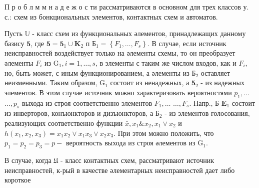 \documentclass[10pt]{article}
\begin{document}
П р о б л м м н а д е ж о с ти рассматриваются в основном для трех классов у. с.: схем из бонкциональных элементов, контактных схем и автоматов.



Пусть $\mathbb{U}$ - класс схем из функциональных әлементов, принадлежащих данному базису $\mathbf{5}$, где $\mathbf{5}=\mathbf{5}_{1} \cup \mathbf{K}_{2}$ п $\mathbf{Б}_{1}=\left\{F_{1}, \ldots, F_{s}\right\}$. В случае, если источник неисправностей воздействует только на әлементы схемы, то он преобразует әлементы $F_{i}$ из $\mathrm{G}_{1}, i=1, \ldots, s$, в элементы с таким же числом входов, как и $F_{i}$, но, быть может, с иным функционированием, а әлементы из $\mathbf{Б}_{2}$ оставляет неизменными. Таким образом, $\mathrm{G}_{1}$ состоит из ненадежных, а $\mathbf{5}_{2}$ - из надежных элементов. В этом случае источник можно характеризовать вероятностями $p_{1}, \ldots$ $\ldots, p_{s}$ выхода из строя соответственно элементов $F_{1}, \ldots$ $\ldots, F_{s}$. Напр., Б $\mathbf{E}_{1}$ состоит из инверторов, конъюнкторов и дизъюнкторов, а $\mathbf{Б}_{2}$ - из элементов голосования, реализующих соответственно функции $\bar{x}, x_{1} \& x_{2}, x_{1} \vee x_{2}$ и $h\left(x_{1}, x_{2}, x_{3}\right)=x_{1} x_{2} \vee x_{1} x_{3} \vee x_{2} x_{3}$. При этом можно положить, что $p_{1}=p_{2}=p_{3}=p-$ вероятность выхода из строя әлементов из $\mathrm{G}_{1}$.



В случае, когда $\mathfrak{U}$ - класс контактных схем, рассматривают источник неисправностей, к-рый в качестве әлементарных неисправностей дает либо короткое
\end{document}
